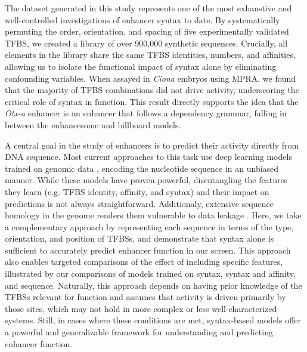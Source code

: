 The dataset generated in this study represents one of the most exhaustive and well-controlled investigations of enhancer syntax to date. By systematically permuting the order, orientation, and spacing of five experimentally validated TFBS, we created a library of over 900,000 synthetic sequences. Crucially, all elements in the library share the same TFBS identities, numbers, and affinities, allowing us to isolate the functional impact of syntax alone by eliminating confounding variables. When assayed in \textit{Ciona} embryos using MPRA, we found that the majority of TFBS combinations did not drive activity, underscoring the critical role of syntax in function. This result directly supports the idea that the \textit{Otx-a} enhancer is an enhancer that follows a dependency grammar\cite{Jindal2021-zk}, falling in between the enhancesome and billboard models.

A central goal in the study of enhancers is to predict their activity directly from DNA sequence. Most current approaches to this task use deep learning models trained on genomic data \cite{De-Winter2025-nz,Sasse2024-ly}, encoding the nucleotide sequence in an unbiased manner. While these models have proven powerful, disentangling the features they learn (e.g. TFBS identity, affinity, and syntax) and their impact on predictions is not always straightforward. Additionaly, extensive sequence homology in the genome renders them vulnerable to data leakage \cite{De_Boer2024-ic,Rafi2025-er}. Here, we take a complementary approach by representing each sequence in terms of the type, orientation, and position of TFBSs, and demonstrate that syntax alone is sufficient to accurately predict enhancer function in our screen. This approach also enables targeted comparisons of the effect of including specific features, illustrated by our comparisons of models trained on syntax, syntax and affinity, and sequence. Naturally, this approach depends on having prior knowledge of the TFBSs relevant for function and assumes that activity is driven primarily by those sites, which may not hold in more complex or less well-characterized systems. Still, in cases where these conditions are met, syntax-based models offer a powerful and generalizable framework for understanding and predicting enhancer function.


